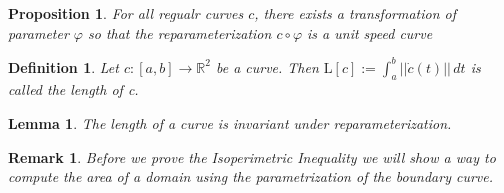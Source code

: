 \documentclass[a4paper]{book}
\newtheorem{lemma}[theorem]{Lemma}%
\newtheorem{remark}[theorem]{Remark}%
\newtheorem{proposition}[theorem]{Proposition}%
\newtheorem{definition}[theorem]{Definition}%
\numberwithin{theorem}{section}%
\begin{document}
\begin{proposition}
    For all regualr curves $c$, there exists a transformation of parameter $\varphi$ so that the reparameterization $c\circ\varphi$ is a unit speed curve
\end{proposition}

\begin{definition}
    Let $c:[a,b]\to\mathbb{R}^2$ be a curve. Then $\mathrm{L}[c]:=\int_{a}^{b}||\dot{c}(t)||\,dt$ is called the length of c.
\end{definition}

\begin{lemma}
    The length of a curve is invariant under reparameterization.
\end{lemma}

\begin{remark}
    Before we prove the Isoperimetric Inequality we will show a way to compute the area of a domain using the parametrization of the boundary curve.
\end{remark}
\end{document}
